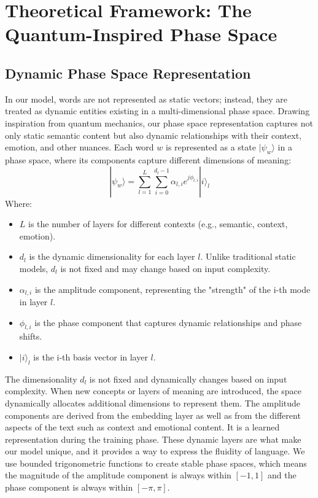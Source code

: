 \documentclass[11pt, a4paper]{article}
\begin{document}
\section{Theoretical Framework: The Quantum-Inspired Phase Space}

\subsection{Dynamic Phase Space Representation}

In our model, words are not represented as static vectors; instead, they are treated as dynamic entities existing in a multi-dimensional phase space. Drawing inspiration from quantum mechanics, our phase space representation captures not only static semantic content but also dynamic relationships with their context, emotion, and other nuances. Each word $w$ is represented as a state $|\psi_w\rangle$ in a phase space, where its components capture different dimensions of meaning:
$$
|\psi_w\rangle = \sum_{l=1}^{L} \sum_{i=0}^{d_l-1} \alpha_{l,i} e^{j\phi_{l,i}} |i\rangle_l
$$
Where:
\begin{itemize}
    \item $L$ is the number of layers for different contexts (e.g., semantic, context, emotion).
    \item $d_l$ is the dynamic dimensionality for each layer $l$. Unlike traditional static models, $d_l$ is not fixed and may change based on input complexity.
    \item $\alpha_{l,i}$ is the amplitude component, representing the "strength" of the i-th mode in layer $l$.
    \item $\phi_{l,i}$ is the phase component that captures dynamic relationships and phase shifts.
    \item $|i\rangle_l$ is the i-th basis vector in layer $l$.
\end{itemize}

The dimensionality $d_l$ is not fixed and dynamically changes based on input complexity. When new concepts or layers of meaning are introduced, the space dynamically allocates additional dimensions to represent them. The amplitude components are derived from the embedding layer as well as from the different aspects of the text such as context and emotional content. It is a learned representation during the training phase. These dynamic layers are what make our model unique, and it provides a way to express the fluidity of language. We use bounded trigonometric functions to create stable phase spaces, which means the magnitude of the amplitude component is always within $[-1, 1]$ and the phase component is always within $[-\pi, \pi]$.
\end{document}
